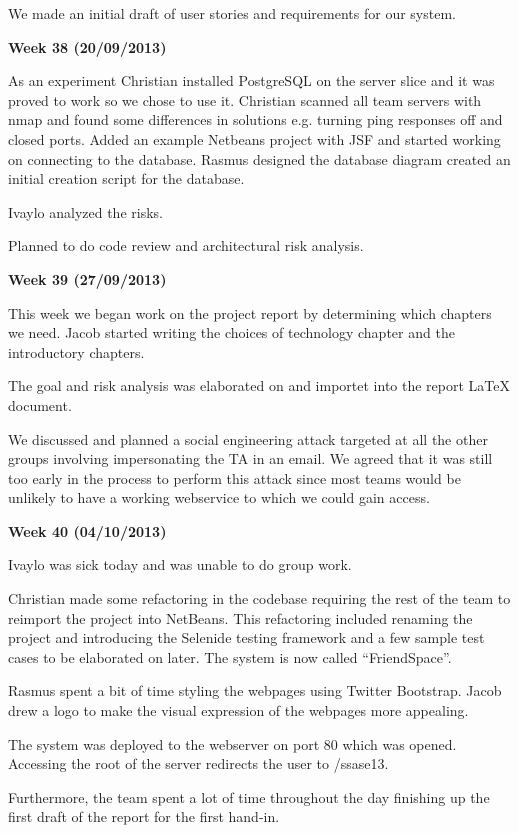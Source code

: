 We made an initial draft of user stories and requirements for our system.


\textbf{Week 38 (20/09/2013)}

As an experiment Christian installed PostgreSQL on the server slice and it was proved to work so we chose to use it. 
Christian scanned all team servers with nmap and found some differences in solutions e.g. turning ping responses off and closed ports.
Added an example Netbeans project with JSF and started working on connecting to the database.
Rasmus designed the database diagram created an initial creation script for the database.

Ivaylo analyzed the risks.

Planned to do code review and architectural risk analysis.


\textbf{Week 39 (27/09/2013)}

This week we began work on the project report by determining which chapters we need. Jacob started writing the choices of technology chapter and the introductory chapters.

The goal and risk analysis was elaborated on and importet into the report LaTeX document.

We discussed and planned a social engineering attack targeted at all the other groups involving impersonating the TA in an email. We agreed that it was still too early in the process to perform this attack since most teams would be unlikely to have a working webservice to which we could gain access.

\textbf{Week 40 (04/10/2013)}

Ivaylo was sick today and was unable to do group work.

Christian made some refactoring in the codebase requiring the rest of the team to reimport the project into NetBeans.
This refactoring included renaming the project and introducing the Selenide testing framework and a few sample test cases to be elaborated on later. The system is now called ``FriendSpace''.

Rasmus spent a bit of time styling the webpages using Twitter Bootstrap. Jacob drew a logo to make the visual expression of the webpages more appealing.

The system was deployed to the webserver on port 80 which was opened. Accessing the root of the server redirects the user to /ssase13.

Furthermore, the team spent a lot of time throughout the day finishing up the first draft of the report for the first hand-in.


